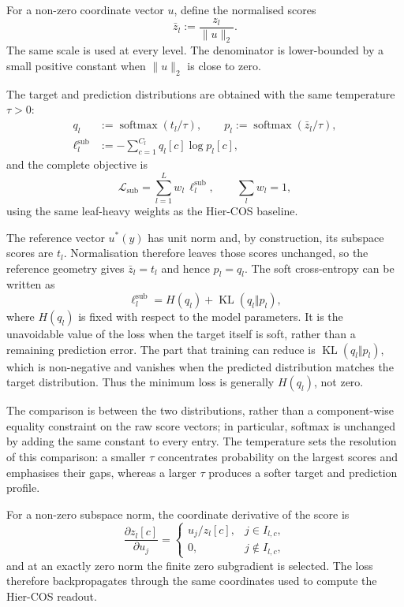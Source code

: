 For a non-zero coordinate vector $u$, define the normalised scores
\[
\bar z_l:=\frac{z_l}{\lVert u\rVert_2}.
\]
The same scale is used at every level. The denominator is lower-bounded by a
small positive constant when $\lVert u\rVert_2$ is close to zero.

The target and prediction distributions are obtained with the same temperature
$\tau>0$:
\[
\begin{aligned}
q_l&:=\operatorname{softmax}(t_l/\tau),
\qquad
p_l:=\operatorname{softmax}(\bar z_l/\tau),\\[0.4ex]
\ell_l^{\mathrm{sub}}&:=-\sum_{c=1}^{C_l}q_l[c]\log p_l[c],
\end{aligned}
\]
and the complete objective is
\begin{equation}
\label{eq:subspace_loss}
\mathcal{L}_{\mathrm{sub}}=\sum_{l=1}^{L}w_l\,\ell_l^{\mathrm{sub}},
\qquad \textstyle\sum_l w_l=1,
\end{equation}
using the same leaf-heavy weights as the Hier-COS baseline.

The reference vector $u^*(y)$ has unit norm and, by construction, its subspace
scores are $t_l$. Normalisation therefore leaves those scores unchanged, so the
reference geometry gives $\bar z_l=t_l$ and hence $p_l=q_l$. The soft
cross-entropy can be written as
\[
\ell_l^{\mathrm{sub}}
=H(q_l)+\operatorname{KL}(q_l\Vert p_l),
\]
where $H(q_l)$ is fixed with respect to the model parameters. It is the
unavoidable value of the loss when the target itself is soft, rather than a
remaining prediction error. The part that training can reduce is
$\operatorname{KL}(q_l\Vert p_l)$, which is non-negative and vanishes when the
predicted distribution matches the target distribution. Thus the minimum loss
is generally $H(q_l)$, not zero.

The comparison is between the two distributions, rather than a component-wise
equality constraint on the raw score vectors; in particular, softmax is
unchanged by adding the same constant to every entry. The temperature sets the
resolution of this comparison: a smaller $\tau$ concentrates probability on
the largest scores and emphasises their gaps, whereas a larger $\tau$ produces
a softer target and prediction profile.

For a non-zero subspace norm, the coordinate derivative of the score is
\[
\frac{\partial z_l[c]}{\partial u_j}
=
\begin{cases}
u_j/z_l[c], & j\in I_{l,c},\\
0, & j\notin I_{l,c},
\end{cases}
\]
and at an exactly zero norm the finite zero subgradient is selected. The loss
therefore backpropagates through the same coordinates used
to compute the Hier-COS readout.

